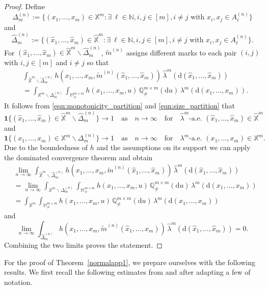 \documentclass{article}
\theoremstyle{definition}
\numberwithin{equation}{section}
\theoremstyle{remark}
\begin{document}
\begin{proof}
Define
$$
\Delta^{(n)}_m := \{ (x_1,\ldots,x_m) \in \mathbb{X}^m: \exists~\ell\in\mathbb{N}, i,j\in[m], i\ne j\text{ with $x_i,x_j\in A^{(n)}_{\ell}$}\}
$$
and
$$
\widehat{\Delta}^{(n)}_m := \{ (\hat{x}_1,\ldots,\hat{x}_m) \in \widehat{\mathbb{X}}^m:  \exists~\ell\in\mathbb{N}, i,j\in[m], i\ne j\text{ with $x_i,x_j\in A^{(n)}_{\ell}$}\}.
$$
For $(\hat{x}_1,\ldots,\hat{x}_m)\in\widehat{\mathbb{X}}^m\backslash\widehat{\Delta}_m^{(n)}$, $\tilde{m}^{(n)}$ assigns different marks to each pair $(i,j)$ with $i,j\in[m]$ and $i\neq j$ so that
\begin{align*}
& \int_{\widehat{\mathbb{X}}^m\backslash\widehat{\Delta}_m^{(n)}} h(x_1,\ldots,x_m, \tilde{m}^{(n)}(\hat{x}_1,\ldots,\hat{x}_m)) \, \widehat{\lambda}^m(\mathrm{d}(\hat{x}_1,\ldots,\hat{x}_m) ) \\
& = \int_{\mathbb{X}^m\backslash\Delta_m^{(n)}} \int_{\mathbb{M}^{m\times m}_{\neq}} h(x_1,\ldots,x_m, u) \, \mathbb{Q}_{\neq}^{m\times m}(\mathrm{d}u) \, \lambda^m(\mathrm{d}(x_1,\ldots,x_m)).
\end{align*}
It follows from \eqref{eqn:monotonicity_partition} and \eqref{eqn:size_partition} that
$$
\mathbf{1}\{ (\hat{x}_1,\ldots,\hat{x}_m)\in\widehat{\mathbb{X}}^m\backslash\widehat{\Delta}_m^{(n)}\} \to 1 \quad \text{as} \quad n\to \infty \quad \text{for} \quad \widehat{\lambda}^m\text{-a.e. } (\hat{x}_1,\ldots,\hat{x}_m)\in\widehat{\mathbb{X}}^m
$$
and
$$
\mathbf{1}\{ (x_1,\ldots,x_m)\in\mathbb{X}^m\backslash\Delta_m^{(n)}\} \to 1 \quad \text{as} \quad n\to \infty \quad \text{for} \quad \lambda^m\text{-a.e. } (x_1,\ldots,x_m)\in\mathbb{X}^m.
$$
Due to the boundedness of $h$ and the assumptions on its support we can apply the dominated convergence theorem and obtain
\begin{align*}
& \lim_{n\to\infty}\int_{\widehat{\mathbb{X}}^m\backslash\widehat{\Delta}_m^{(n)}} h(x_1,\ldots,x_m, \tilde{m}^{(n)}(\hat{x}_1,\ldots,\hat{x}_m)) \, \widehat{\lambda}^m(\mathrm{d}(\hat{x}_1,\ldots,\hat{x}_m) ) \\
& = \lim_{n\to\infty}\int_{\mathbb{X}^m\backslash\Delta_m^{(n)}} \int_{\mathbb{M}^{m\times m}_{\neq}} h(x_1,\ldots,x_m, u) \, \mathbb{Q}_{\neq}^{m\times m}(\mathrm{d}u) \, \lambda^m(\mathrm{d}(x_1,\ldots,x_m)) \\ & = \int_{\mathbb{X}^m} \int_{\mathbb{M}^{m\times m}_{\neq}} h(x_1,\ldots,x_m, u) \, \mathbb{Q}_{\neq}^{m\times m}(\mathrm{d}u) \, \lambda^m(\mathrm{d}(x_1,\ldots,x_m))
\end{align*}
and
$$
\lim_{n\to\infty} \int_{ \widehat{\Delta}^{(n)}_m} h(x_1,\ldots,x_m, \tilde{m}^{(n)}(\hat{x}_1,\ldots,\hat{x}_m)) \, \widehat{\lambda}^m(\mathrm{d}(\hat{x}_1,\ldots,\hat{x}_m) )=0.
$$
Combining the two limits proves the statement.
\end{proof}
For the proof of Theorem~\ref{normalapp1}, we prepare ourselves with the following results.
We first recall the following estimates from \cite[Theorem~4.7]{reitznerschulte} and \cite[Theorem~4.2]{schulte} after adapting a few of notation. 
\end{document}
